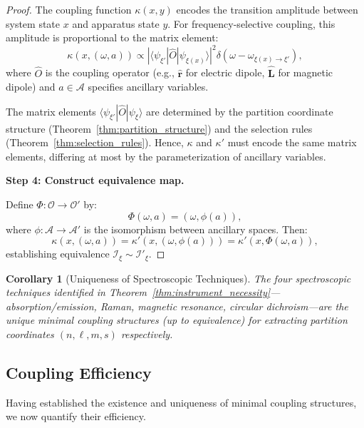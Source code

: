 \documentclass[twocolumn,10pt,a4paper]{article}
\newtheorem{corollary}[theorem]{Corollary}
\theoremstyle{remark}
\newcommand{\oscillator}{\mathcal{O}}
\begin{document}
\begin{proof}
The coupling function $\kappa(x, y)$ encodes the transition amplitude between system state $x$ and apparatus state $y$. For frequency-selective coupling, this amplitude is proportional to the matrix element:
\begin{equation}
\kappa(x, (\omega, a)) \propto |\langle \psi_{\xi'} | \hat{O} | \psi_{\xi(x)} \rangle|^2 \delta(\omega - \omega_{\xi(x) \to \xi'}),
\end{equation}
where $\hat{O}$ is the coupling operator (e.g., $\hat{\mathbf{r}}$ for electric dipole, $\hat{\mathbf{L}}$ for magnetic dipole) and $a \in \mathcal{A}$ specifies ancillary variables.

The matrix elements $\langle \psi_{\xi'} | \hat{O} | \psi_{\xi} \rangle$ are determined by the partition coordinate structure (Theorem~\ref{thm:partition_structure}) and the selection rules (Theorem~\ref{thm:selection_rules}). Hence, $\kappa$ and $\kappa'$ must encode the same matrix elements, differing at most by the parameterization of ancillary variables.

\textbf{Step 4: Construct equivalence map.}

Define $\Phi: \oscillator \to \oscillator'$ by:
\begin{equation}
\Phi(\omega, a) = (\omega, \phi(a)),
\end{equation}
where $\phi: \mathcal{A} \to \mathcal{A}'$ is the isomorphism between ancillary spaces. Then:
\begin{equation}
\kappa(x, (\omega, a)) = \kappa'(x, (\omega, \phi(a))) = \kappa'(x, \Phi(\omega, a)),
\end{equation}
establishing equivalence $\mathcal{I}_\xi \sim \mathcal{I}'_\xi$.
\end{proof}

\begin{corollary}[Uniqueness of Spectroscopic Techniques]
\label{cor:uniqueness_spectroscopy}
The four spectroscopic techniques identified in Theorem~\ref{thm:instrument_necessity}—absorption/emission, Raman, magnetic resonance, circular dichroism—are the unique minimal coupling structures (up to equivalence) for extracting partition coordinates $(n, \ell, m, s)$ respectively.
\end{corollary}

\subsection{Coupling Efficiency}

Having established the existence and uniqueness of minimal coupling structures, we now quantify their efficiency.
\end{document}
